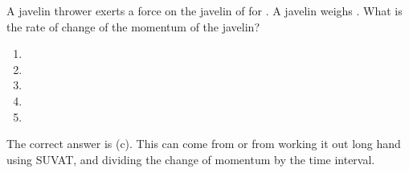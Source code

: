
\begin{problem}[A1989PIQ1l] 
{A javelin thrower exerts a force on the javelin of  for . A javelin weighs . What is the rate of change of the momentum of the javelin?
\begin{enumerate}
	\item {}
	\item {}
	\item {}
	\item {}
	\item {}
\end{enumerate}
}
{}
{The correct answer is (c). This can come from  or from working it out long hand using SUVAT, and dividing the change of momentum by the time interval.}
\end{problem}